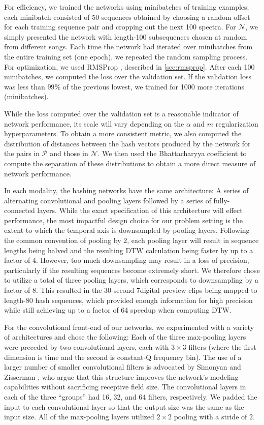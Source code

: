 For efficiency, we trained the networks using minibatches of training examples; each minibatch consisted of 50 sequences obtained by choosing a random offset for each training sequence pair and cropping out the next 100 spectra.
For $\mathcal{N}$, we simply presented the network with length-100 subsequences chosen at random from different songs.
Each time the network had iterated over minibatches from the entire training set (one epoch), we repeated the random sampling process.
For optimization, we used RMSProp \cite{tieleman2012lecture}, described in \cref{sec:rmsprop}.
After each 100 minibatches, we computed the loss over the validation set.
If the validation loss was less than $99\%$ of the previous lowest, we trained for 1000 more iterations (minibatches).

While the loss computed over the validation set is a reasonable indicator of network performance, its scale will vary depending on the $\alpha$ and $m$ regularization hyperparameters.
To obtain a more consistent metric, we also computed the distribution of distances between the hash vectors produced by the network for the pairs in $\mathcal{P}$ and those in $\mathcal{N}$.
We then used the Bhattacharyya coefficient \cite{bhattacharyya1943measure} to compute the separation of these distributions to obtain a more direct measure of network performance.

In each modality, the hashing networks have the same architecture: A series of alternating convolutional and pooling layers followed by a series of fully-connected layers.
While the exact specification of this architecture will effect performance, the most impactful design choice for our problem setting is the extent to which the temporal axis is downsampled by pooling layers.
Following the common convention of pooling by 2, each pooling layer will result in sequence lengths being halved and the resulting DTW calculation being faster by up to a factor of 4.
However, too much downsampling may result in a loss of precision, particularly if the resulting sequences become extremely short.
We therefore chose to utilize a total of three pooling layers, which corresponds to downsampling by a factor of 8.
This resulted in the 30-second 7digital preview clips being mapped to length-80 hash sequences, which provided enough information for high precision while still achieving up to a factor of 64 speedup when computing DTW.

For the convolutional front-end of our networks, we experimented with a variety of architectures and chose the following:
Each of the three max-pooling layers were preceded by two convolutional layers, each with $3 \times 3$ filters (where the first dimension is time and the second is constant-Q frequency bin).
The use of a larger number of smaller convolutional filters is advocated by Simonyan and Zisserman \cite{simonyan2014very}, who argue that this structure improves the network's modeling capabilities without sacrificing receptive field size.
The convolutional layers in each of the three ``groups'' had 16, 32, and 64 filters, respectively.
We padded the input to each convolutional layer so that the output size was the same as the input size.
All of the max-pooling layers utilized $2 \times 2$ pooling with a stride of $2$.

